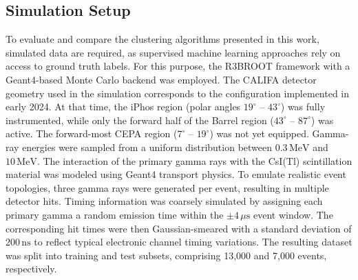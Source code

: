 \documentclass[final,5p,times,twocolumn]{elsarticle}
\begin{document}
\subsection{Simulation Setup}\label{s_sec:data_sim}
To evaluate and compare the clustering algorithms presented in this work, simulated data are required, as supervised machine learning approaches rely on access to ground truth labels. For this purpose, the R3BROOT framework with a Geant4-based Monte Carlo \cite{agostinelli2003geant4} backend was employed.\newline
The CALIFA detector geometry used in the simulation corresponds to the configuration implemented in early 2024. At that time, the iPhos region (polar angles $19^\circ$ -- $43^\circ$) was fully instrumented, while only the forward half of the Barrel region ($43^\circ$ -- $87^\circ$) was active. The forward-most CEPA region ($7^\circ$ -- $19^\circ$) was not yet equipped.\newline
Gamma-ray energies were sampled from a uniform distribution between $0.3\,\mathrm{MeV}$ and $10\,\mathrm{MeV}$. The interaction of the primary gamma rays with the CsI(Tl) scintillation material was modeled using Geant4 transport physics.\newline
To emulate realistic event topologies, three gamma rays were generated per event, resulting in multiple detector hits. Timing information was coarsely simulated by assigning each primary gamma a random emission time within the $\pm 4\,\mu\mathrm{s}$ event window. The corresponding hit times were then Gaussian-smeared with a standard deviation of $200\,\mathrm{ns}$ to reflect typical electronic channel timing variations.\newline
The resulting dataset was split into training and test subsets, comprising 13{,}000 and 7{,}000 events, respectively.
\end{document}
